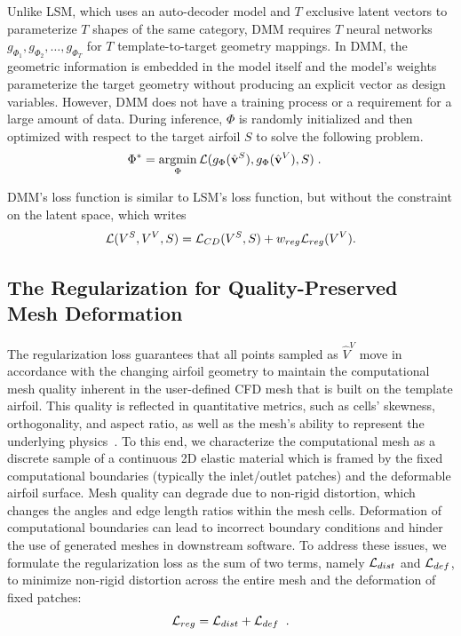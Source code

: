 Unlike LSM, which uses an auto-decoder model and $T$ exclusive latent vectors to parameterize $T$ shapes of the same category, DMM requires $T$ neural networks $g_{\Phi_1}, g_{\Phi_2},\ldots, g_{\Phi_T}$ for $T$ template-to-target geometry mappings.
In DMM, the geometric information is embedded in the model itself and the model's weights parameterize the target geometry without producing an explicit vector as design variables. However, DMM does not have a training process or a requirement for a large amount of data. During inference, $\Phi$ is randomly initialized and then optimized with respect to the target airfoil $S$ to solve the following problem.
\begin{align}
\Phi^* &=  \argmin_{\Phi} \cL(g_{\Phi}(\hat{\bv}^S), g_{\Phi}(\hat{\bv}^V), S) \; .
\label{ch4:eq:agmin_g_phi}
\end{align}

DMM's loss function is similar to LSM's loss function, but without the constraint on the latent space, which writes
\begin{align}
\mathcal{L}(V^S, V^V, S) = \mathcal{L}_{CD}(V^S, S) + w_{reg}\mathcal{L}_{reg}(V^V).
\end{align}

\subsection{The Regularization for Quality-Preserved Mesh Deformation}
The regularization loss guarantees that all points sampled as $\hat{V}^V$ move in accordance with the changing airfoil geometry to maintain the computational mesh quality inherent in the user-defined CFD mesh that is built on the template airfoil. This quality is reflected in quantitative metrics, such as cells' skewness, orthogonality, and aspect ratio, as well as the mesh's ability to represent the underlying physics~\cite{aa.Knupp2007}.
To this end, we characterize the computational mesh as a discrete sample of a continuous 2D elastic material which is framed by the fixed computational boundaries (typically the inlet/outlet patches) and the deformable airfoil surface.
Mesh quality can degrade due to non-rigid distortion, which changes the angles and edge length ratios within the mesh cells. 
Deformation of computational boundaries can lead to incorrect boundary conditions and hinder the use of generated meshes in downstream software.
To address these issues, we formulate the regularization loss as the sum of two terms, namely $\mathcal{L}_{dist}$ and $\mathcal{L}_{def}$, to minimize non-rigid distortion across the entire mesh and the deformation of fixed patches:
\begin{equation}
    \mathcal{L}_{reg} = \mathcal{L}_{dist} + \mathcal{L}_{def}\;\;.
\end{equation}

